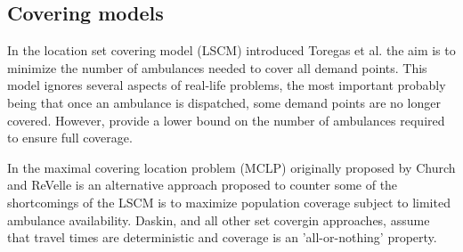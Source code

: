 \subsection{Covering models}
In the location set covering model (LSCM)
introduced Toregas et al. \cite{toregas1971location}
the aim
is to minimize
the number of ambulances needed
to cover all demand points.
This model
ignores several aspects of real-life problems,
the most important
probably being that
once an ambulance is dispatched,
some demand points
are no longer covered.
However,
provide
a lower bound
on the number of ambulances
required to ensure full coverage.

In the maximal covering location problem (MCLP)
originally proposed by Church and ReVelle \cite{church1974maximal}
is an alternative approach
proposed to counter some of the shortcomings of the LSCM
is to maximize population coverage
subject to limited ambulance availability.
Daskin,
and all other set covergin approaches,
assume that
travel times are deterministic
and coverage is an 'all-or-nothing' property.
